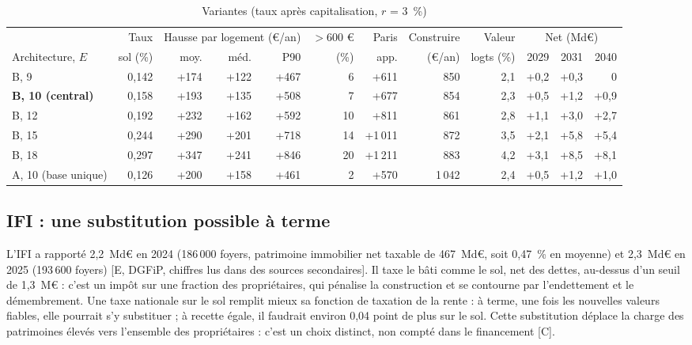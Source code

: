 \begin{table}[!htbp]\centering\scriptsize
\caption{Variantes (taux après capitalisation, $r$ = 3~\%)}\label{tab:fon4_var}
\setlength{\tabcolsep}{3pt}
\begin{tabular}{@{}lrrrrrrrrrrr@{}}
\toprule
 & Taux & \multicolumn{3}{c}{Hausse par logement (€/an)} & $>$600 € & Paris & Construire & Valeur & \multicolumn{3}{c}{Net (Md€)} \\
\cmidrule(lr){3-5}\cmidrule(l){10-12}
Architecture, $E$ & sol (\%) & moy. & méd. & P90 & (\%) & app. & (€/an) & logts (\%) & 2029 & 2031 & 2040 \\
\midrule
B, 9 & 0,142 & +174 & +122 & +467 & 6 & +611 & 850 & 2,1 & +0,2 & +0,3 & 0 \\
\textbf{B, 10 (central)} & 0,158 & +193 & +135 & +508 & 7 & +677 & 854 & 2,3 & +0,5 & +1,2 & +0,9 \\
B, 12 & 0,192 & +232 & +162 & +592 & 10 & +811 & 861 & 2,8 & +1,1 & +3,0 & +2,7 \\
B, 15 & 0,244 & +290 & +201 & +718 & 14 & +1\,011 & 872 & 3,5 & +2,1 & +5,8 & +5,4 \\
B, 18 & 0,297 & +347 & +241 & +846 & 20 & +1\,211 & 883 & 4,2 & +3,1 & +8,5 & +8,1 \\
A, 10 (base unique) & 0,126 & +200 & +158 & +461 & 2 & +570 & 1\,042 & 2,4 & +0,5 & +1,2 & +1,0 \\
\bottomrule
\end{tabular}
\par{}
\end{table}

\subsection{IFI : une substitution possible à terme}

L'IFI a rapporté 2,2~Md€ en 2024 (186\,000 foyers, patrimoine immobilier net taxable de 467~Md€, soit
0,47~\% en moyenne) et 2,3~Md€ en 2025 (193\,600 foyers) [E, DGFiP, chiffres lus dans des
sources secondaires]. Il taxe le bâti comme le sol, net des dettes, au-dessus d'un seuil de 1,3~M€ : c'est un impôt sur
une fraction des propriétaires, qui pénalise la construction et se contourne par l'endettement et le démembrement. Une
taxe nationale sur le sol remplit mieux sa fonction de taxation de la rente : à terme, une fois les nouvelles valeurs
fiables, elle pourrait s'y substituer ; à recette égale, il faudrait environ 0,04
point de plus sur le sol. Cette substitution déplace la charge des patrimoines élevés vers l'ensemble des propriétaires :
c'est un choix distinct, non compté dans le financement [C].

